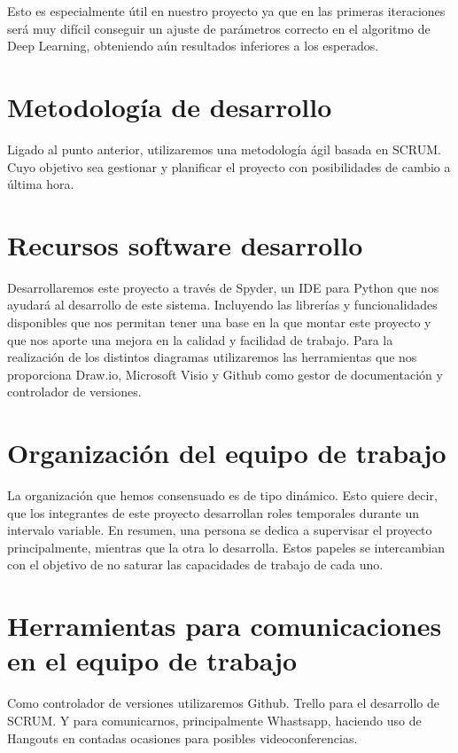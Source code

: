 Esto es especialmente útil en nuestro proyecto ya que en las primeras iteraciones será muy difícil conseguir un ajuste de parámetros correcto en el algoritmo de Deep Learning, obteniendo aún resultados inferiores a los esperados.

\section{Metodología de desarrollo}

Ligado al punto anterior, utilizaremos una metodología ágil basada en SCRUM. Cuyo objetivo sea gestionar y planificar el proyecto con posibilidades de cambio a última hora. 

\section{Recursos software desarrollo}

Desarrollaremos este proyecto a través de Spyder, un IDE para Python que nos ayudará al desarrollo de este sistema. Incluyendo las librerías y funcionalidades disponibles que nos permitan tener una base en la que montar este proyecto y que nos aporte una mejora en la calidad y facilidad de trabajo. Para la realización de los distintos diagramas utilizaremos las herramientas que nos proporciona Draw.io, Microsoft Visio y Github como gestor de documentación y controlador de versiones.

\section{Organización del equipo de trabajo}

La organización que hemos consensuado es de tipo dinámico. Esto quiere decir, que los integrantes de este proyecto desarrollan roles temporales durante un intervalo variable. En resumen, una persona se dedica a supervisar el proyecto principalmente, mientras que la otra lo desarrolla. Estos papeles se intercambian con el objetivo de no saturar las capacidades de trabajo de cada uno.

\section{Herramientas para comunicaciones en el equipo de trabajo}

Como controlador de versiones utilizaremos Github. Trello para el desarrollo de SCRUM. Y para comunicarnos, principalmente Whastsapp, haciendo uso de Hangouts en contadas ocasiones para posibles videoconferencias.

